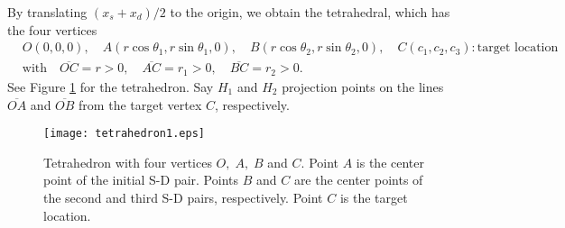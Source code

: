 \documentclass[10pt]{article}
\numberwithin{equation}{section}
\numberwithin{figure}{section}
\begin{document}
By translating $(x_s+x_d)/2$ to the origin, we obtain the tetrahedral, which has the four vertices
\begin{equation}
\begin{split}
&O(0, 0, 0), \quad A(r \cos\theta_1,r \sin\theta_1,0 ), \quad
B(r \cos\theta_2,r \sin\theta_2,0 ), \quad
C(c_1,c_2,c_3) : \mbox{target location} \\
&\mbox{with} \quad \overline{OC}=r>0, \quad \overline{AC}=r_1>0, 
\quad \overline{BC}=r_2>0.
\end{split}
\end{equation}
See Figure \ref{fig_tetrahedron} for the tetrahedron.
Say $H_1$ and $H_2$ projection points on the lines 
$\overline{OA}$ and $\overline{OB}$ from the target vertex $C$, respectively. 

\begin{figure}[ht]
\centering
\texttt{[image: tetrahedron1.eps]}
\caption{Tetrahedron with four vertices $O,\;A,\;B$ and $C$. Point $A$ is the center point of the initial S-D pair. Points $B$ and $C$ are the center points of the second and third S-D pairs, respectively. Point $C$ is the target location.} 
\label{fig_tetrahedron}
\end{figure}
\end{document}
